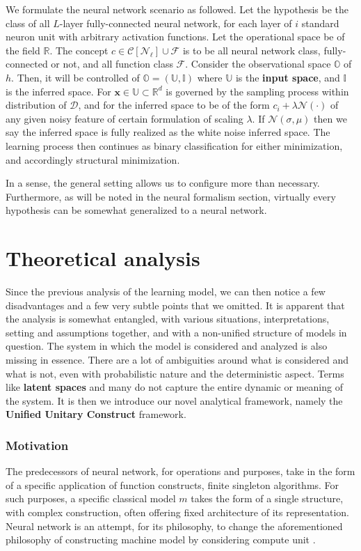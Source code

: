 \documentclass{article}
\begin{document}
\begin{setting}
    We formulate the neural network scenario as followed. Let the hypothesis be the class of all $L$-layer fully-connected neural network, for each layer of $i$ standard neuron unit with arbitrary activation functions. Let the operational space be of the field $\mathbb{R}$. The concept $c\in \mathcal{C}[\mathcal{N}_{\ell}]\cup \mathcal{F}$ is to be all neural network class, fully-connected or not, and all function class $\mathcal{F}$. Consider the observational space $\mathbb{O}$ of $h$. Then, it will be controlled of $\mathbb{O}=(\mathbb{U},\mathbb{I})$ where $\mathbb{U}$ is the \textbf{input space}, and $\mathbb{I}$ is the inferred space. For $\mathbf{x}\in \mathbb{U}\subset \mathbb{R}^{d}$ is governed by the sampling process within distribution of $\mathcal{D}$, and for the inferred space to be of the form $c_{i}+\lambda\mathcal{N}(\cdot)$ of any given noisy feature of certain formulation of scaling $\lambda$. If $\mathcal{N}(\sigma, \mu)$ then we say the inferred space is fully realized as the white noise inferred space. The learning process then continues as binary classification for either minimization, and accordingly structural minimization. 
\end{setting}
In a sense, the general setting allows us to configure more than necessary. Furthermore, as will be noted in the neural formalism section, virtually every hypothesis can be somewhat generalized to a neural network. 

\clearpage 

\section{Theoretical analysis}

Since the previous analysis of the learning model, we can then notice a few disadvantages and a few very subtle points that we omitted. It is apparent that the analysis is somewhat entangled, with various situations, interpretations, setting and assumptions together, and with a non-unified structure of models in question. The system in which the model is considered and analyzed is also missing in essence. There are a lot of ambiguities around what is considered and what is not, even with probabilistic nature and the deterministic aspect. Terms like \textbf{latent spaces} and many do not capture the entire dynamic or meaning of the system. It is then we introduce our novel analytical framework, namely the \textbf{Unified Unitary Construct} framework. 
\subsubsection{Motivation}
The predecessors of neural network, for operations and purposes, take in the form of a specific application of function constructs, finite singleton algorithms. For such purposes, a specific classical model $m$ takes the form of a single structure, with complex construction, often offering fixed architecture of its representation. Neural network is an attempt, for its philosophy, to change the aforementioned philosophy of constructing machine model by considering compute unit \cite{mcculloch_logical_1943,Rosenblatt1958ThePA}. 
\end{document}
